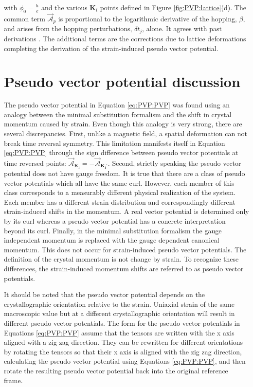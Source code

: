 with $\phi_0=\frac{h}{e}$ and the various $\bm{K}_i$ points defined in Figure \ref{fig:PVP:lattice}(d).
The common term $\vec{\mathcal{A}}_p$ is proportional to the logarithmic derivative of the hopping, $\beta$, and arises from the hopping perturbations, $\delta t_j$, alone.
It agrees with past derivations \cite{CastroNeto2009,Vozmediano2010}. 
The additional terms are the corrections due to lattice deformations completing the derivation of the strain-induced pseudo vector potential.

\section{Pseudo vector potential discussion}
The pseudo vector potential in Equation \ref{eq:PVP:PVP} was found using an analogy between the minimal substitution formalism and the shift in crystal momentum caused by strain.
Even though this analogy is very strong, there are several discrepancies.
First, unlike a magnetic field, a spatial deformation can not break time reversal symmetry.
This limitation manifests itself in Equation \ref{eq:PVP:PVP} through the sign difference between pseudo vector potentials at time reversed points: $\vec{\mathcal{A}}_{\bm{K_i}} = - \vec{\mathcal{A}}_{\bm{K_i'}}$.
Second, strictly speaking the pseudo vector potential does not have gauge freedom.
It is true that there are a class of pseudo vector potentials which all have the same curl.
However, each member of this class corresponds to a measurably different physical realization of the system.
Each member has a different strain distribution and correspondingly different strain-induced shifts in the momentum.
A real vector potential is determined only by its curl whereas a pseudo vector potential has a concrete interpretation beyond its curl.
Finally, in the minimal substitution formalism the gauge independent momentum is replaced with the gauge dependent canonical momentum. 
This does not occur for strain-induced pseudo vector potentials.
The definition of the crystal momentum is not change by strain.
To recognize these differences, the strain-induced momentum shifts are referred to as pseudo vector potentials.

It should be noted that the pseudo vector potential depends on the crystallographic orientation relative to the strain.
Uniaxial strain of the same macroscopic value but at a different crystallographic orientation will result in different pseudo vector potentials.
The form for the pseudo vector potentials in Equations \ref{eq:PVP:PVP} assume that the tensors are written with the x axis aligned with a zig zag direction.
They can be rewritten for different orientations by rotating the tensors so that their x axis is aligned with the zig zag direction, calculating the pseudo vector potential using Equations \ref{eq:PVP:PVP}, and then rotate the resulting pseudo vector potential back into the original reference frame.

